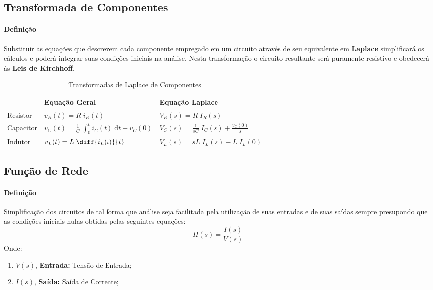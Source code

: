\documentclass{article}
\begin{document}
    \subsection{Transformada de Componentes}
        \paragraph{Definição}Substituir as equações que descrevem cada componente empregado em um circuito através de seu equivalente em \textbf{Laplace} simplificará os cálculos e poderá integrar suas condições iniciais na análise. Nesta transformação o circuito resultante será puramente resistivo e obedecerá às \textbf{Leis de Kirchhoff}.
            \begin{table}[H]
                \centering
                \begingroup
                \renewcommand{\arraystretch}{1.25}
                \begin{tabular}[]{lll}
                                & Equação Geral                                                         & Equação Laplace\\\hline
                    Resistor  & $v_{R}(t) = R\;i_{R}(t)$                                              & $V_{R}(s) = R\;I_{R}(s)$\\[2.5mm]
                    Capacitor & $v_{C}(t) = \frac{1}{C}\;\int_{0}^{t} i_{C}(t)\;\text{d}t + v_{C}(0)$ & $V_{C}(s) = \frac{1}{sC}\;I_{C}(s) + \frac{v_{C}(0)}{s}$\\[2.5mm]
                    Indutor   & $v_{L}(t) = L\;\diff{i_{L}(t)}{t}$                                    & $V_{L}(s) = sL\;I_{L}(s) - L\;I_{L}(0)$\\[2.5mm]\hline
                \end{tabular}
                \endgroup
                \caption{Transformadas de Laplace de Componentes}\label{table:LaplaceComponents}
            \end{table} \noindent

    \subsection{Função de Rede}
        \paragraph{Definição}Simplificação dos circuitos de tal forma que análise seja facilitada pela utilização de suas entradas e de suas saídas sempre presupondo que as condições iniciais nulas obtidas pelas seguintes equações:
            \begin{equation}
                \boxed{H(s) = \frac{I(s)}{V(s)}}
            \end{equation}
        Onde:
            \begin{enumerate}[noitemsep]
                \item $V(s)$, \textbf{Entrada:} Tensão de Entrada;
                \item $I(s)$, \textbf{Saída:} Saída de Corrente;
            \end{enumerate}
\end{document}
